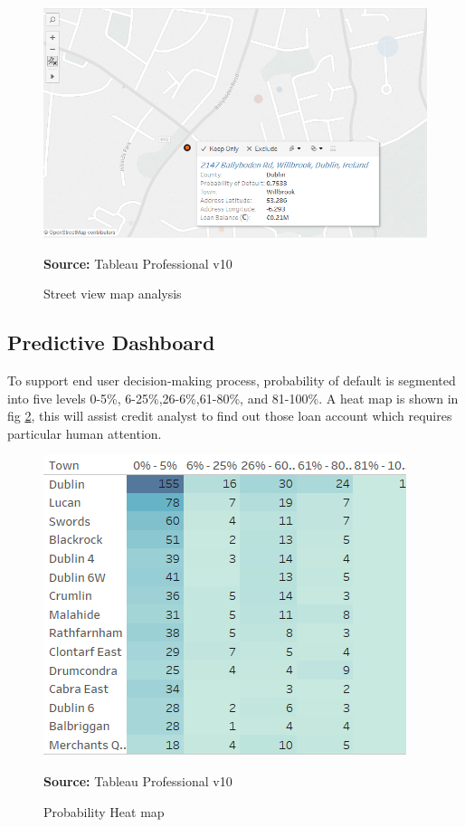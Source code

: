 \begin{center}
\begin{figure}[!htb]
\includegraphics[scale=0.5]{street.png}
\centering
\caption{Street view map analysis}{\textbf{Source:} Tableau Professional v10}
\label{fig:street}
\end{figure}
\end{center}

\subsection{Predictive Dashboard}

To support end user decision-making process, probability of default is segmented into five levels 0-5\%, 6-25\%,26-6\%,61-80\%, and 81-100\%. A heat map is shown in fig \ref{fig:heatmap}, this will assist credit analyst to find out those loan account which requires particular human attention.

\begin{center}
\begin{figure}[!htb]
\includegraphics[scale=0.7]{heatmap.png}
\centering
\caption{Probability Heat map}{\textbf{Source:} Tableau Professional v10}
\label{fig:heatmap}
\end{figure}
\end{center}


